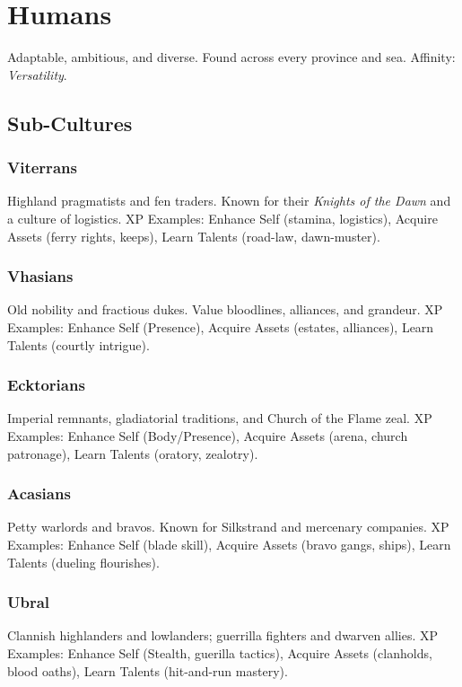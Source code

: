 \documentclass[11pt]{book}
\begin{document}
\section{Humans}
Adaptable, ambitious, and diverse. Found across every province and sea.  
Affinity: \emph{Versatility}.  

\subsection{Sub-Cultures}
\subsubsection{Viterrans}
Highland pragmatists and fen traders. Known for their \emph{Knights of the Dawn} and a culture of logistics.  
XP Examples: Enhance Self (stamina, logistics), Acquire Assets (ferry rights, keeps), Learn Talents (road-law, dawn-muster).  

\subsubsection{Vhasians}
Old nobility and fractious dukes. Value bloodlines, alliances, and grandeur.  
XP Examples: Enhance Self (Presence), Acquire Assets (estates, alliances), Learn Talents (courtly intrigue).  

\subsubsection{Ecktorians}
Imperial remnants, gladiatorial traditions, and Church of the Flame zeal.  
XP Examples: Enhance Self (Body/Presence), Acquire Assets (arena, church patronage), Learn Talents (oratory, zealotry).  

\subsubsection{Acasians}
Petty warlords and bravos. Known for Silkstrand and mercenary companies.  
XP Examples: Enhance Self (blade skill), Acquire Assets (bravo gangs, ships), Learn Talents (dueling flourishes).  

\subsubsection{Ubral}
Clannish highlanders and lowlanders; guerrilla fighters and dwarven allies.  
XP Examples: Enhance Self (Stealth, guerilla tactics), Acquire Assets (clanholds, blood oaths), Learn Talents (hit-and-run mastery).  
\end{document}
